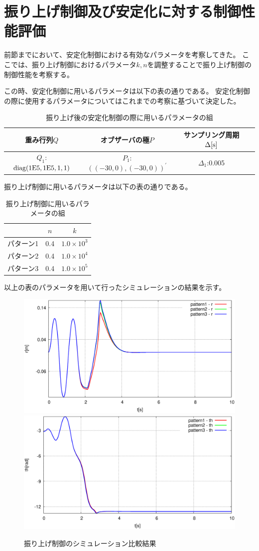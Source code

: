 \section{振り上げ制御及び安定化に対する制御性能評価}
	前節までにおいて、安定化制御における有効なパラメータを考察してきた。
	ここでは、振り上げ制御におけるパラメータ$k,n$を調整することで振り上げ制御の制御性能を考察する。
	\par
	この時、安定化制御に用いるパラメータは以下の表の通りである。
	安定化制御の際に使用するパラメータについてはこれまでの考察に基づいて決定した。
	\begin{table}[htb]
		\begin{center}
			\caption{振り上げ後の安定化制御の際に用いるパラメータの組}
			\medskip
			
			\begin{tabular}{|c|c|c|c|}\hline
				重み行列$Q$ & オブザーバの極$P$ & サンプリング周期$\Delta[\rm{s}]$ \\ \hline\hline
				$Q_1$:$\rm{diag}(1E5,1E5,1,1)$ & $P_1$:$((-30,0),(-30,0))^{'}$ & $\Delta_1$:0.005 \\ \hline
			\end{tabular}
		\end{center}
		\label{table:huriage_control}
	\end{table}
	振り上げ制御に用いるパラメータは以下の表の通りである。
	\begin{table}[H]
		\begin{center}
			\caption{振り上げ制御に用いるパラメータの組}
			\medskip
			
			\begin{tabular}{|c|c|c|}\hline
				& $n$ & $k$ \\ \hline\hline
				パターン1 & 0.4 & $1.0×10^3$  \\ \hline
				パターン2 & 0.4 & $1.0×10^4$  \\ \hline
				パターン3 & 0.4 & $1.0×10^5$  \\ \hline
			\end{tabular}
		\end{center}
		\label{table:huriage_huriage}
	\end{table}
	以上の表のパラメータを用いて行ったシミュレーションの結果を示す。
	\begin{figure}[H]
		\centering
		\includegraphics[width=0.4\linewidth]{gazo/Hsimu_R.eps}
		\includegraphics[width=0.4\linewidth]{gazo/Hsimu_TH.eps}
		\caption{振り上げ制御のシミュレーション比較結果}
		\label{image:simu_huriage}
	\end{figure}
